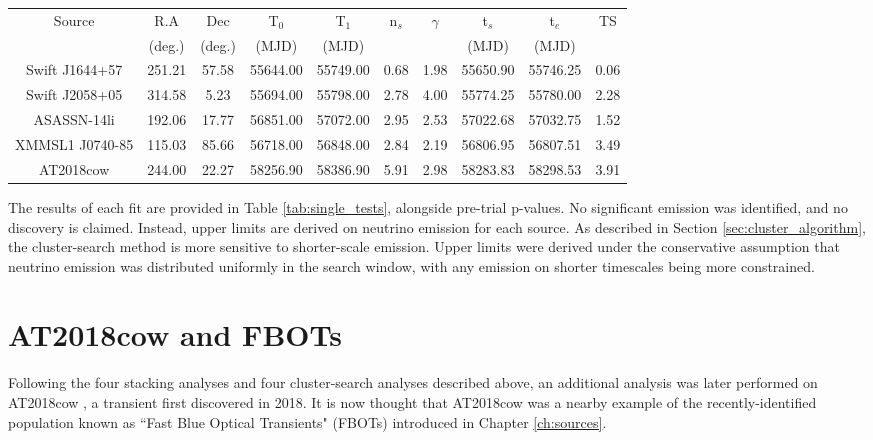 \begin{table*}[]
	\centering
	\begin{tabular}{||c |c c c c | c c c c| c||} 
	\hline
	Source & R.A & Dec & T$_{0}$ & T$_{1}$ & n$_{s}$ & $\gamma$ & t$_{s}$ & t$_{e}$ & TS\\
	& (deg.) & (deg.) & (MJD) & (MJD) & & & (MJD) & (MJD) & \\
	\hline
	Swift J1644+57 & 251.21 & 57.58 & 55644.00 & 55749.00 & 0.68 & 1.98 & 55650.90 & 55746.25 & 0.06\\
	Swift J2058+05 & 314.58 & 5.23 & 55694.00 & 55798.00 & 2.78 & 4.00 & 55774.25 & 55780.00 & 2.28\\
	ASASSN-14li & 192.06 & 17.77 & 56851.00 & 57072.00 & 2.95 & 2.53 & 57022.68 & 57032.75 & 1.52\\
	XMMSL1 J0740-85 & 115.03 & 85.66 & 56718.00 & 56848.00 & 2.84 & 2.19 & 56806.95 & 56807.51 & 3.49\\
	\hline
	AT2018cow & 244.00 & 22.27 & 58256.90 & 58386.90 & 5.91 & 2.98 & 58283.83 & 58298.53 & 3.91\\
	\hline
	\end{tabular}
	\caption{Summary of the five individual TDEs for which the temporal-cluster-search method was applied. All but AT2018cow were included in the stacking analysis.}
	\label{tab:single_tests}
\end{table*}{}

The results of each fit are provided in Table \ref{tab:single_tests}, alongside pre-trial p-values. No significant emission was identified, and no discovery is claimed. Instead, upper limits are derived on neutrino emission for each source. As described in Section \ref{sec:cluster_algorithm}, the cluster-search method is more sensitive to shorter-scale emission. Upper limits were derived under the conservative assumption that neutrino emission was distributed uniformly in the search window, with any emission on shorter timescales being more constrained. 

\section{AT2018cow and FBOTs}

Following the four stacking analyses and four cluster-search analyses described above, an additional analysis was later performed on AT2018cow , a transient first discovered in 2018. It is now thought that AT2018cow was a nearby example of the recently-identified population known as ``Fast Blue Optical Transients" (FBOTs) introduced in Chapter \ref{ch:sources}. 

